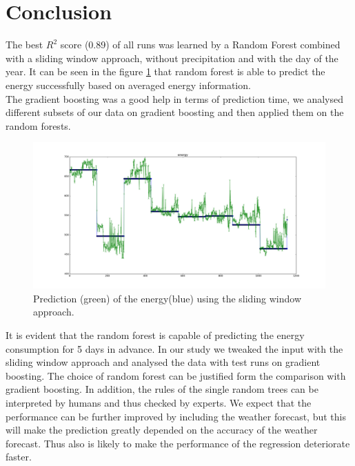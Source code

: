 \documentclass{scrartcl}
\begin{document}
\section{Conclusion}
\label{sec:conclusion}
The best $R^{2}$ score (0.89) of all runs was learned by a Random Forest combined with a sliding window approach, without precipitation and with the day of the year. It can be seen in the figure \ref{fig:predict-energy} that random forest is able to predict the energy successfully based on averaged energy information.\\
The gradient boosting was a good help in terms of prediction time, we analysed different subsets of our data on gradient boosting and then applied them on the random forests.
\begin{figure}[H]
  \includegraphics[width=0.8\linewidth]{img/predict-energy--0p890.png}
  \caption{Prediction (green) of the energy(blue) using the sliding window approach.}
  \label{fig:predict-energy}
\end{figure}
It is evident that the random forest is capable of predicting the energy consumption for 5 days in advance. In our study we tweaked the input with the sliding window approach and analysed the data with test runs on gradient boosting. The choice of random forest can be justified form the comparison with gradient boosting. In addition, the rules of the single random trees can be interpreted by humans and thus checked by experts. We expect that the performance can be further improved by including the weather forecast, but this will make the prediction greatly depended on the accuracy of the weather forecast. Thus also is likely to make the performance of the regression deteriorate faster.



\end{document}

